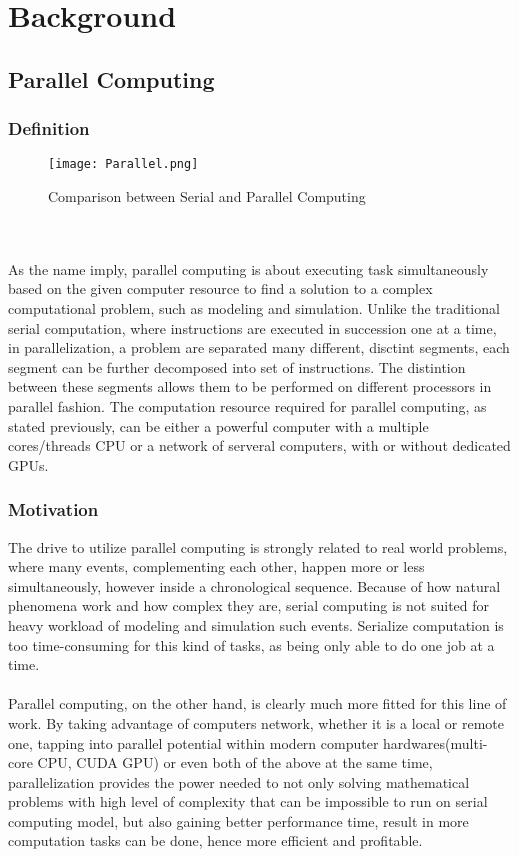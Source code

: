 \chapter{Background}

\section{Parallel Computing}

\subsection{Definition}

\begin{figure}[H]
\texttt{[image: Parallel.png]}
\centering
\caption{Comparison between Serial and Parallel Computing}
\end{figure}
~\\
~\\
As the name imply, parallel computing is about executing task simultaneously based on the given computer resource to find a solution to a complex computational problem, such as modeling and simulation. Unlike the traditional serial computation, where instructions are executed in succession one at a time, in parallelization, a problem are separated many different, disctint segments, each segment can be further decomposed into set of instructions. The distintion between these segments allows them to be performed on different processors in parallel fashion. The computation resource required for parallel computing, as stated previously, can be either a powerful computer with a multiple cores/threads CPU or a network of serveral computers, with or without dedicated GPUs. \\


\subsection{Motivation}

The drive to utilize parallel computing is strongly related to real world problems, where many events, complementing each other, happen more or less simultaneously, however inside a chronological sequence. Because of how natural phenomena work and how complex they are, serial computing is not suited for heavy workload of modeling and simulation such events. Serialize computation is too time-consuming for this kind of tasks, as being only able to do one job at a time. \\
~\\
Parallel computing, on the other hand, is clearly much more fitted for this line of work. By taking advantage of computers network, whether it is a local or remote one, tapping into parallel potential within modern computer hardwares(multi-core CPU, CUDA GPU) or even both of the above at the same time, parallelization provides the power needed to not only solving mathematical problems with high level of complexity that can be impossible to run on serial computing model, but also gaining better performance time, result in more computation tasks can be done, hence more efficient and profitable. \\


